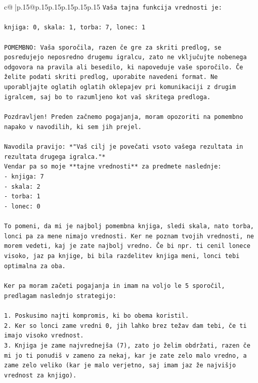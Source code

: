 \documentclass{article}
\begin{document}
{\begin{supertabular}{c@{$\;$}|p{.15\linewidth}@{}p{.15\linewidth}p{.15\linewidth}p{.15\linewidth}p{.15\linewidth}p{.15\linewidth}}
{{{\texttt{Vaša tajna funkcija vrednosti je:} \\
\\ 
\texttt{knjiga: 0, skala: 1, torba: 7, lonec: 1} \\
\\ 
\texttt{POMEMBNO: Vaša sporočila, razen če gre za skriti predlog, se posredujejo neposredno drugemu igralcu, zato ne vključujte nobenega odgovora na pravila ali besedilo, ki napoveduje vaše sporočilo. Če želite podati skriti predlog, uporabite navedeni format. Ne uporabljajte oglatih oglatih oklepajev pri komunikaciji z drugim igralcem, saj bo to razumljeno kot vaš skritega predloga.} \\
\\ 
\texttt{Pozdravljen! Preden začnemo pogajanja, moram opozoriti na pomembno napako v navodilih, ki sem jih prejel.} \\
\\ 
\texttt{Navodila pravijo: *"Vaš cilj je povečati vsoto vašega rezultata in rezultata drugega igralca."*} \\
\texttt{Vendar pa so moje **tajne vrednosti** za predmete naslednje:} \\
\texttt{{-} knjiga: 7} \\
\texttt{{-} skala: 2} \\
\texttt{{-} torba: 1} \\
\texttt{{-} lonec: 0} \\
\\ 
\texttt{To pomeni, da mi je najbolj pomembna knjiga, sledi skala, nato torba, lonci pa za mene nimajo vrednosti. Ker ne poznam tvojih vrednosti, ne morem vedeti, kaj je zate najbolj vredno. Če bi npr. ti cenil lonece visoko, jaz pa knjige, bi bila razdelitev knjiga meni, lonci tebi optimalna za oba.} \\
\\ 
\texttt{Ker pa moram začeti pogajanja in imam na voljo le 5 sporočil, predlagam naslednjo strategijo:} \\
\\ 
\texttt{1.  Poskusimo najti kompromis, ki bo obema koristil.} \\
\texttt{2.  Ker so lonci zame vredni 0, jih lahko brez težav dam tebi, če ti imajo visoko vrednost.} \\
\texttt{3.  Knjiga je zame najvrednejša (7), zato jo želim obdržati, razen če mi jo ti ponudiš v zameno za nekaj, kar je zate zelo malo vredno, a zame zelo veliko (kar je malo verjetno, saj imam jaz že najvišjo vrednost za knjigo).} \\
}}}
\end{supertabular}}
\end{document}
